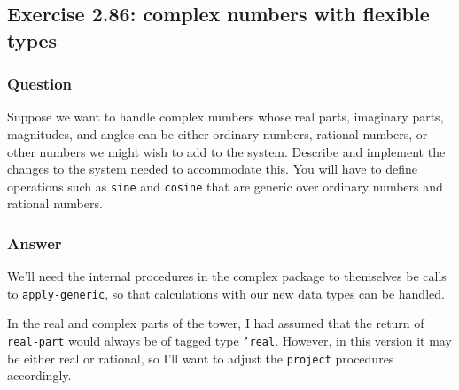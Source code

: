 \documentclass[final,fleqn,titlepage,twoside]{article}
\begin{document}
\subsection{Exercise 2.86: complex numbers with flexible types}
\label{sec:org125e1c3}
\subsubsection{Question}
\label{sec:org8083dc1}
Suppose we want to handle complex numbers whose real parts, imaginary parts,
magnitudes, and angles can be either ordinary numbers, rational numbers, or
other numbers we might wish to add to the system. Describe and implement the
changes to the system needed to accommodate this. You will have to define
operations such as \texttt{sine} and \texttt{cosine} that are generic over
ordinary numbers and rational numbers.

\subsubsection{Answer}
\label{sec:org13e7c0c}
We'll need the internal procedures in the complex package to themselves be calls
to \texttt{apply-generic}, so that calculations with our new data types can
be handled.

In the real and complex parts of the tower, I had assumed that the return of
\texttt{real-part} would always be of tagged type \texttt{'real}. However,
in this version it may be either real or rational, so I'll want to adjust the
\texttt{project} procedures accordingly.
\end{document}
